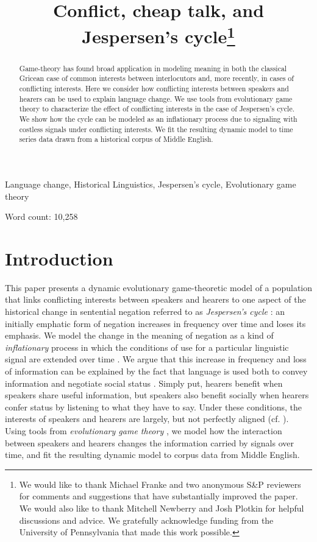 \documentclass[linguex]{sp}
\title[Conflict, cheap talk, and Jespersen's cycle]{Conflict, cheap talk, and Jespersen's cycle\thanks{We would like to thank Michael Franke and two anonymous S\&P reviewers for comments and suggestions that have substantially improved the paper. We would also like to thank Mitchell Newberry and Josh Plotkin for helpful discussions and advice. We gratefully acknowledge funding from the University of Pennsylvania that made this work possible.}}
\author[Ahern \& Clark]{ 
  \spauthor{Christopher Ahern \\ \institute{Department of Linguistics,\\ University of Pennsylvania}} \AND
  \spauthor{Robin Clark \\ \institute{Department of Linguistics,\\ University of Pennsylvania}}
}
\theoremstyle{definition} \newtheorem{definition}{Definition}
\begin{document}
\maketitle

\begin{abstract}
Game-theory has found broad application in modeling meaning in both the classical Gricean case of common interests between interlocutors and, more recently, in cases of conflicting interests. Here we consider how conflicting interests between speakers and hearers can be used to explain language change. We use tools from  evolutionary game theory to characterize the effect of conflicting interests in the case of Jespersen's cycle.  We show how the cycle can be modeled as an inflationary process due to signaling with costless signals under conflicting interests. We fit the resulting dynamic model to time series data drawn from a historical corpus of Middle English.
\end{abstract}

\begin{keywords}
	 Language change, Historical Linguistics, Jespersen's cycle, Evolutionary game theory
\end{keywords}

\noindent
Word count: 10,258

\section{Introduction}
\label{Introduction}


This paper presents a dynamic evolutionary game-theoretic model of a population that links conflicting interests between speakers and hearers to one aspect of the historical change in sentential negation referred to as \emph{Jespersen's cycle} \citeyearpar{jespersen:1917}: an initially emphatic form of negation increases in frequency over time and  loses its emphasis. We model the change in the meaning of negation as a kind of \emph{inflationary} process in which the conditions of use for a particular linguistic signal are extended over time \citep{dahl:2001}. We argue that this increase in frequency and loss of information can be explained by the fact that language is used both to convey information and negotiate social status \citep{dessalles2007,franke-etal:2012}. Simply put, hearers benefit when speakers share useful information, but  speakers also benefit socially when hearers confer status by listening to what they have to say. Under these conditions, the interests of speakers and hearers are largely, but not perfectly aligned (cf. \citealt{benz-jager-van-rooij:2006, franke-etal:2012, de-jaegher-van-rooij:2013, asher2013strategic}). Using tools from \emph{evolutionary game theory} \citep{maynard-smith1982, hofbauer-sigmund1998}, we model how the interaction between speakers and hearers changes the information carried by signals over time, and fit the resulting dynamic model to corpus data from Middle English.
\end{document}
